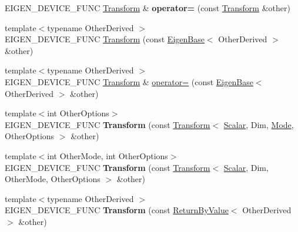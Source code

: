 \begin{DoxyCompactItemize}
E\+I\+G\+E\+N\+\_\+\+D\+E\+V\+I\+C\+E\+\_\+\+F\+U\+NC \mbox{\hyperlink{class_eigen_1_1_transform}{Transform}} \& {\bfseries operator=} (const \mbox{\hyperlink{class_eigen_1_1_transform}{Transform}} \&other)
\item 
{\footnotesize template$<$typename Other\+Derived $>$ }\\E\+I\+G\+E\+N\+\_\+\+D\+E\+V\+I\+C\+E\+\_\+\+F\+U\+NC \mbox{\hyperlink{class_eigen_1_1_transform_a5ee8b0067f6dadc04684be504e11a0c3}{Transform}} (const \mbox{\hyperlink{struct_eigen_1_1_eigen_base}{Eigen\+Base}}$<$ Other\+Derived $>$ \&other)
\item 
{\footnotesize template$<$typename Other\+Derived $>$ }\\E\+I\+G\+E\+N\+\_\+\+D\+E\+V\+I\+C\+E\+\_\+\+F\+U\+NC \mbox{\hyperlink{class_eigen_1_1_transform}{Transform}} \& \mbox{\hyperlink{class_eigen_1_1_transform_ada0d6d0b497e2db223e23fcaa4e8961d}{operator=}} (const \mbox{\hyperlink{struct_eigen_1_1_eigen_base}{Eigen\+Base}}$<$ Other\+Derived $>$ \&other)
\item 
\mbox{\label{class_eigen_1_1_transform_a5271ad7a41a47b7a6ab1d55141a69192}} 
{\footnotesize template$<$int Other\+Options$>$ }\\E\+I\+G\+E\+N\+\_\+\+D\+E\+V\+I\+C\+E\+\_\+\+F\+U\+NC {\bfseries Transform} (const \mbox{\hyperlink{class_eigen_1_1_transform}{Transform}}$<$ \mbox{\hyperlink{class_eigen_1_1_transform_a4e69ced9d651745b8ed4eda46f41795d}{Scalar}}, Dim, \mbox{\hyperlink{struct_mode}{Mode}}, Other\+Options $>$ \&other)
\item 
\mbox{\label{class_eigen_1_1_transform_afee5c6820f39d01ba818c07c1d33133d}} 
{\footnotesize template$<$int Other\+Mode, int Other\+Options$>$ }\\E\+I\+G\+E\+N\+\_\+\+D\+E\+V\+I\+C\+E\+\_\+\+F\+U\+NC {\bfseries Transform} (const \mbox{\hyperlink{class_eigen_1_1_transform}{Transform}}$<$ \mbox{\hyperlink{class_eigen_1_1_transform_a4e69ced9d651745b8ed4eda46f41795d}{Scalar}}, Dim, Other\+Mode, Other\+Options $>$ \&other)
\item 
\mbox{\label{class_eigen_1_1_transform_a5b6398bba010bc76b11cce93fa52ca5c}} 
{\footnotesize template$<$typename Other\+Derived $>$ }\\E\+I\+G\+E\+N\+\_\+\+D\+E\+V\+I\+C\+E\+\_\+\+F\+U\+NC {\bfseries Transform} (const \mbox{\hyperlink{class_eigen_1_1_return_by_value}{Return\+By\+Value}}$<$ Other\+Derived $>$ \&other)

\end{DoxyCompactItemize}
